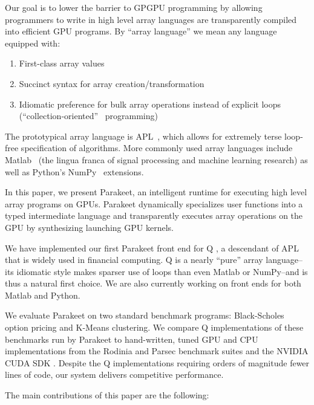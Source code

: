 \documentclass[preprint]{sigplanconf}
\begin{document}
Our goal is to lower the barrier to GPGPU programming by allowing programmers to 
write in high level array languages are transparently compiled into efficient GPU programs. 
By ``array language'' we mean any language equipped with:
\begin{enumerate}
\item First-class array values
\item Succinct syntax for array creation/transformation
\item Idiomatic preference for bulk array operations instead of explicit loops
(``collection-oriented''~\cite{Sip91} programming)
\end{enumerate}

The prototypical array language is APL~\cite{Iverson62}, which allows for
extremely terse loop-free specification of algorithms. More commonly used array 
languages include Matlab~\cite{Moler80} (the lingua franca of signal processing
and machine learning research) as well as Python's NumPy~\cite{Oliphant07}
extensions. 


In this paper, we present Parakeet, an intelligent runtime for executing high
level array programs on GPUs. Parakeet dynamically specializes user functions 
into a typed intermediate language and transparently executes array operations
on the GPU by synthesizing launching GPU kernels.


We have implemented our first Parakeet front end for Q \cite{Borr08}, a
descendant of APL that is widely used in financial computing. 
Q is a nearly ``pure'' array language--its idiomatic style makes sparser use of
loops than even Matlab or NumPy--and is thus a natural first choice.
We are also currently working on front ends for both Matlab and Python.

We evaluate Parakeet on two standard benchmark programs: Black-Scholes option
pricing and K-Means clustering.  We compare Q implementations of these
benchmarks run by Parakeet to hand-written, tuned GPU and CPU implementations
from the Rodinia \cite{Che09} and Parsec \cite{Bien08} benchmark suites and the
NVIDIA CUDA SDK \cite{NvidSD}.  Despite the Q implementations requiring orders
of magnitude fewer lines of code, our system delivers competitive performance.

The main contributions of this paper are the following:
\end{document}
